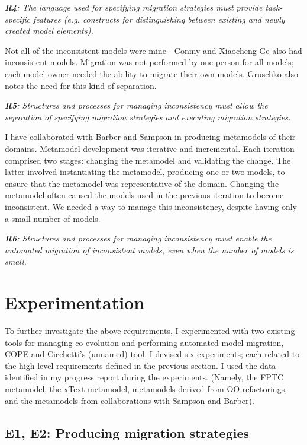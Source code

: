 \documentclass[a4paper]{article}
\begin{document}
\emph{\textbf{R4}: The language used for specifying migration strategies must provide task-specific features (e.g. constructs for distinguishing between existing and newly created model elements).}

Not all of the inconsistent models were mine - Conmy and Xiaocheng Ge also had inconsistent models. Migration was not performed by one person for all models; each model owner needed the ability to migrate their own models. Gruschko also notes the need for this kind of separation.

\emph{\textbf{R5}: Structures and processes for managing inconsistency must allow the separation of specifying migration strategies and executing migration strategies.}

I have collaborated with Barber and Sampson in producing metamodels of their domains. Metamodel development was iterative and incremental. Each iteration comprised two stages: changing the metamodel and validating the change. The latter involved instantiating the metamodel, producing one or two models, to ensure that the metamodel was representative of the domain. Changing the metamodel often caused the models used in the previous iteration to become inconsistent. We needed a way to manage this inconsistency, despite having only a small number of models.

\emph{\textbf{R6}: Structures and processes for managing inconsistency must enable the automated migration of inconsistent models, even when the number of models is small.}


\section{Experimentation}

To further investigate the above requirements, I experimented with two existing tools for managing co-evolution and performing automated model migration, COPE and Cicchetti's (unnamed) tool. I devised six experiments; each related to the high-level requirements defined in the previous section. I used the data identified in my progress report during the experiments. (Namely, the FPTC metamodel, the xText metamodel, metamodels derived from OO refactorings, and the metamodels from collaborations with Sampson and Barber).

\subsection{E1, E2: Producing migration strategies}
\end{document}
